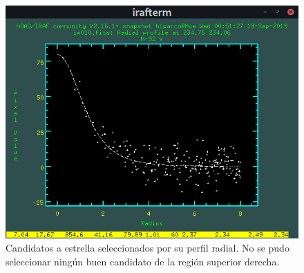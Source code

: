 \documentclass[12pt]{article}
\begin{document}
\begin{figure}[H]
  \centering
   \includegraphics[scale= 0.65]{im07.png}
  \caption{Candidatos a estrella seleccionados por su perfil radial. No se pudo seleccionar ningún buen candidato de la región superior derecha.}
  \label{im07}
\end{figure}



{}

\end{document}
